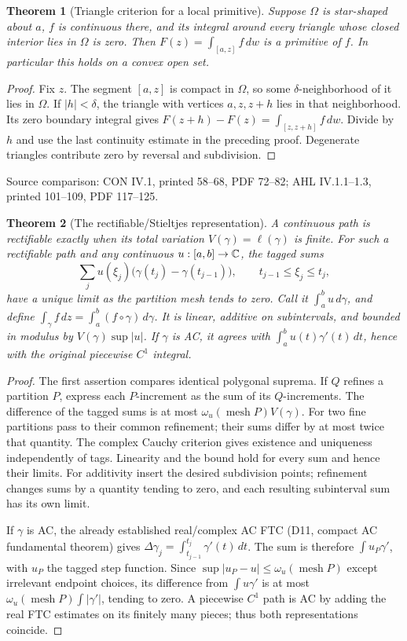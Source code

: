 \documentclass[11pt,a4paper,openany]{book}
\newtheorem{theorem}{Theorem}[chapter]
\theoremstyle{definition}
\theoremstyle{remark}\newtheorem{remark}[theorem]{Remark}
\newcommand{\dd}{\,d}\newcommand{\iu}{\mathrm i}
\newcommand{\family}[1]{}
\newcommand{\source}[1]{\par\begingroup\small\sffamily\color{black!65}Source comparison: #1\par\endgroup}
\begin{document}
\begin{theorem}[Triangle criterion for a local primitive]\family{D12.03.05}\label{d12:03-05}
Suppose \(\Omega\) is star-shaped about \(a\), \(f\) is continuous there,
and its integral around every triangle whose closed interior lies in
\(\Omega\) is zero. Then
\(F(z)=\int_{[a,z]}f\dd w\) is a primitive of \(f\).
In particular this holds on a convex open set.
\end{theorem}
\begin{proof}
Fix \(z\). The segment \([a,z]\) is compact in \(\Omega\), so some
\(\delta\)-neighborhood of it lies in \(\Omega\). If \(|h|<\delta\),
the triangle with vertices \(a,z,z+h\) lies in that neighborhood.
Its zero boundary integral gives
\(F(z+h)-F(z)=\int_{[z,z+h]}f\dd w\).
Divide by \(h\) and use the last continuity estimate in the preceding proof.
Degenerate triangles contribute zero by reversal and subdivision.
\end{proof}
\source{CON IV.1, printed 58--68, PDF 72--82; AHL IV.1.1--1.3, printed 101--109, PDF 117--125.}

\begin{theorem}[The rectifiable/Stieltjes representation]\family{D12.03.06}\label{d12:03-06}
A continuous path is rectifiable exactly when its total variation
\(V(\gamma)=\ell(\gamma)\) is finite. For such a rectifiable path and any
continuous \(u:[a,b]\to\mathbb C\), the tagged sums
\[
 \sum_j u(\xi_j)\bigl(\gamma(t_j)-\gamma(t_{j-1})\bigr),
 \qquad t_{j-1}\le\xi_j\le t_j,
\]
have a unique limit as the partition mesh tends to zero.
Call it \(\int_a^b u\dd\gamma\), and define
\(\int_\gamma f\dd z=\int_a^b(f\circ\gamma)\dd\gamma\).
It is linear, additive on subintervals, and bounded in modulus by
\(V(\gamma)\sup|u|\). If \(\gamma\) is AC, it agrees with
\(\int_a^b u(t)\gamma'(t)\dd t\), hence with the original
piecewise \(C^1\) integral.
\end{theorem}
\begin{proof}
The first assertion compares identical polygonal suprema.
If \(Q\) refines a partition \(P\), express each \(P\)-increment as the
sum of its \(Q\)-increments. The difference of the tagged sums is at most
\(\omega_u(\operatorname{mesh}P)V(\gamma)\).
For two fine partitions pass to their common refinement; their sums
differ by at most twice that quantity. The complex Cauchy criterion
gives existence and uniqueness independently of tags.
Linearity and the bound hold for every sum and hence their limits.
For additivity insert the desired subdivision points; refinement changes
sums by a quantity tending to zero, and each resulting subinterval sum
has its own limit.

If \(\gamma\) is AC, the already established real/complex AC FTC
(D11, compact AC fundamental theorem) gives
\(\Delta\gamma_j=\int_{t_{j-1}}^{t_j}\gamma'(t)\dd t\).
The sum is therefore \(\int u_P\gamma'\), with \(u_P\) the tagged step
function. Since \(\sup|u_P-u|\le\omega_u(\operatorname{mesh}P)\) except
irrelevant endpoint choices, its difference from \(\int u\gamma'\)
is at most \(\omega_u(\operatorname{mesh}P)\int|\gamma'|\), tending
to zero. A piecewise \(C^1\) path is AC by adding the real FTC estimates
on its finitely many pieces; thus both representations coincide.
\end{proof}
\end{document}
